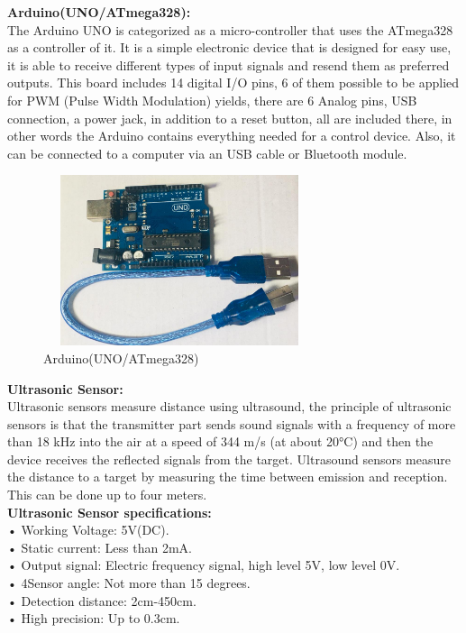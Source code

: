 \documentclass[12pt,a4paper]{report}
\begin{document}
{\textbf{Arduino(UNO/ATmega328):}} \\

The Arduino UNO is categorized as a micro-controller that uses the ATmega328 as a controller of it. It is a simple electronic device that is designed for easy use, it is able to receive different types of input signals and resend them as preferred outputs. This board includes 14 digital I/O pins, 6 of them possible to be applied for PWM (Pulse Width Modulation) yields, there are 6 Analog pins, USB connection, a power jack, in addition to a reset button, all are included there, in other words the Arduino contains everything needed for a control device. Also, it can be connected to a computer via an USB cable or Bluetooth module\cite{Arduino}.


\begin{figure}[H]
    \centering
    \graphicspath{ {./images/} }
    \includegraphics[width=8cm, height=5cm]{uno1.jpg}
    \caption{Arduino(UNO/ATmega328)}
    \label{fig:mesh1}
\end{figure}
\textbf{{Ultrasonic Sensor:}}\\


Ultrasonic sensors measure distance using ultrasound, the principle of ultrasonic sensors is that the transmitter part sends sound signals with a frequency of more than 18 kHz into the air at a speed of 344 m/s (at about 20°C) and then the device receives the reflected signals from the target. Ultrasound sensors measure the distance to a target by measuring the time between emission and reception. This can be done up to four meters\cite{UltrasonicSensor}.\\

\textbf{Ultrasonic Sensor specifications:}\\

•	Working Voltage: 5V(DC).\\
•	Static current: Less than 2mA.\\ 
•	Output signal: Electric frequency signal, high level 5V, low level 0V.\\ 
•	4Sensor angle: Not more than 15 degrees.\\
•	Detection distance: 2cm-450cm.\\ 
•	High precision: Up to 0.3cm.\\
\end{document}
